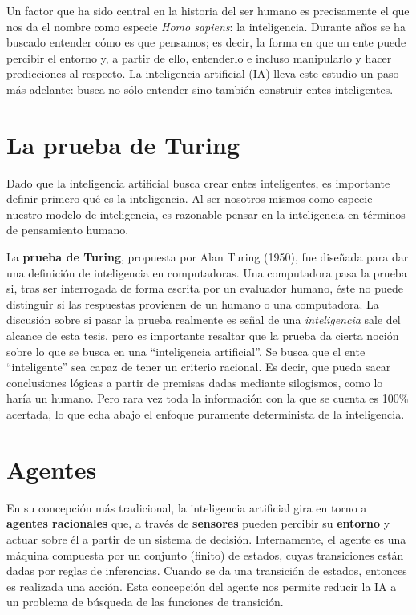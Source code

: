 Un factor que ha sido central en la historia del ser humano es
precisamente el que nos da el nombre como especie \textit{Homo
sapiens}: la inteligencia. Durante años se ha buscado entender cómo es
que pensamos; es decir, la forma en que un ente puede percibir el
entorno y, a partir de ello, entenderlo e incluso manipularlo y hacer
predicciones al respecto.  La inteligencia artificial (IA) lleva este
estudio un paso más adelante: busca no sólo entender sino también
construir entes inteligentes.

\section{La prueba de Turing}
Dado que la inteligencia artificial busca crear entes inteligentes,
es importante definir primero qué es la inteligencia. Al ser nosotros
mismos como especie nuestro modelo de inteligencia, es razonable pensar
en la inteligencia en términos de pensamiento humano.

La \textbf{prueba de Turing}, propuesta por Alan Turing (1950), fue
diseñada para dar una definición de inteligencia en computadoras. Una
computadora pasa la prueba si, tras ser interrogada de forma escrita
por un evaluador humano, éste no puede distinguir si las respuestas
provienen de un humano o una computadora.  La discusión sobre si pasar
la prueba realmente es señal de una \textit{inteligencia} sale del
alcance de esta tesis, pero es importante resaltar que la prueba da
cierta noción sobre lo que se busca en una ``inteligencia
artificial''.  Se busca que el ente ``inteligente'' sea capaz de tener
un criterio racional.  Es decir, que pueda sacar conclusiones lógicas
a partir de premisas dadas mediante silogismos, como lo haría un
humano. Pero rara vez toda la información con la que se cuenta es
100\% acertada, lo que echa abajo el enfoque puramente determinista de
la inteligencia.

\section{Agentes}
En su concepción más tradicional, la inteligencia artificial gira en torno a
\textbf{agentes racionales} que, a través de \textbf{sensores} pueden percibir
su \textbf{entorno} y actuar sobre él a partir de un sistema de
decisión.  Internamente, el agente es una máquina compuesta por un
conjunto (finito) de estados, cuyas transiciones están dadas por
reglas de inferencias. Cuando se da una transición de estados,
entonces es realizada una acción. Esta concepción del agente nos
permite reducir la IA a un problema de búsqueda de las funciones de
transición.

